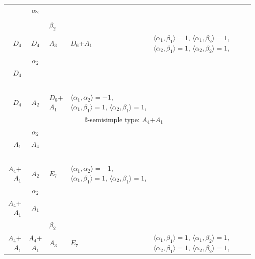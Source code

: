 \documentclass[12pt]{report}
\begin{document}
\begin{appendix}
{\begin{longtable}{rcl p{1cm}p{1cm}p{3cm} }
\hline\hline\begin{tabular}{cc}$\alpha_1$+ & $\alpha_2$\\\tiny{  } & \tiny{  }\end{tabular} &\begin{tabular}{c} = \\~ \end{tabular} & \begin{tabular}{cc}$\beta_1$+ & $\beta_2$\\\tiny{ $D_4$ } & \tiny{ $D_4$ }\end{tabular} & $A_3$ & $D_6$+$A_1$ &  $\langle\alpha_1, \beta_1\rangle=1$, $\langle\alpha_1, \beta_2\rangle=1$, $\langle\alpha_2, \beta_1\rangle=1$, $\langle\alpha_2, \beta_2\rangle=1$, 
\\
\begin{tabular}{cc}$\alpha_1$+ & $\alpha_2$\\\tiny{ $D_4$ } & \tiny{  }\end{tabular} &\begin{tabular}{c} = \\~ \end{tabular} & \begin{tabular}{c}$\beta_1$\\\tiny{ $D_4$ }\end{tabular} & $A_2$ & $D_6$+$A_1$ & $\langle\alpha_1, \alpha_2\rangle=-1$,  $\langle\alpha_1, \beta_1\rangle=1$, $\langle\alpha_2, \beta_1\rangle=1$, 
\\
\hline\multicolumn{5}{c}{$\mathfrak{k}$-semisimple type: $A_4$+$A_1$}\\
\hline\hline\begin{tabular}{cc}$\alpha_1$+ & $\alpha_2$\\\tiny{ $A_1$ } & \tiny{ $A_4$ }\end{tabular} &\begin{tabular}{c} = \\~ \end{tabular} & \begin{tabular}{c}$\beta_1$\\\tiny{ $A_4$+$A_1$ }\end{tabular} & $A_2$ & $E_7$ & $\langle\alpha_1, \alpha_2\rangle=-1$,  $\langle\alpha_1, \beta_1\rangle=1$, $\langle\alpha_2, \beta_1\rangle=1$, 
\\
\begin{tabular}{cc}$\alpha_1$+ & $\alpha_2$\\\tiny{ $A_4$+$A_1$ } & \tiny{ $A_1$ }\end{tabular} &\begin{tabular}{c} = \\~ \end{tabular} & \begin{tabular}{cc}$\beta_1$+ & $\beta_2$\\\tiny{ $A_4$+$A_1$ } & \tiny{ $A_4$+$A_1$ }\end{tabular} & $A_3$ & $E_7$ &  $\langle\alpha_1, \beta_1\rangle=1$, $\langle\alpha_1, \beta_2\rangle=1$, $\langle\alpha_2, \beta_1\rangle=1$, $\langle\alpha_2, \beta_2\rangle=1$, 

\end{longtable}}
\end{appendix}
\end{document}
